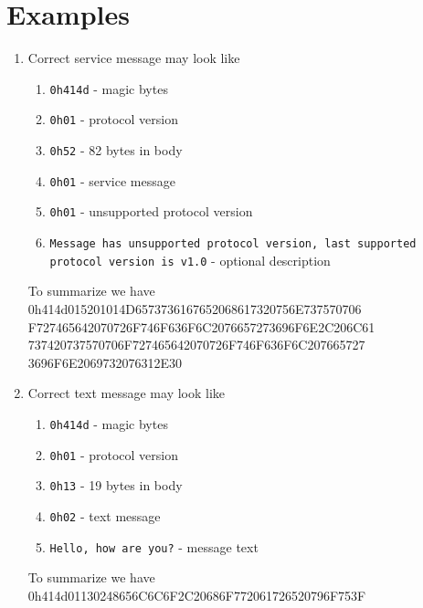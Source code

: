 \documentclass[12pt]{article}
\begin{document}
\section{Examples}
\begin{enumerate}
\item Correct service message may look like
\begin{enumerate}
\item \texttt{0h414d} - magic bytes
\item \texttt{0h01} - protocol version
\item \texttt{0h52} - 82 bytes in body
\item \texttt{0h01} - service message
\item \texttt{0h01} - unsupported protocol version
\item \texttt{Message has unsupported protocol version, last supported protocol version is v1.0} - optional description
\end{enumerate}
To summarize we have \\
0h414d015201014D6573736167652068617320756E737570706 \\
F727465642070726F746F636F6C2076657273696F6E2C206C61 \\
737420737570706F727465642070726F746F636F6C207665727 \\
3696F6E2069732076312E30
\item Correct text message may look like
\begin{enumerate}
\item \texttt{0h414d} - magic bytes
\item \texttt{0h01} - protocol version
\item \texttt{0h13} - 19 bytes in body
\item \texttt{0h02} - text message
\item \texttt{Hello, how are you?} - message text
\end{enumerate}
To summarize we have
0h414d01130248656C6C6F2C20686F772061726520796F753F
\end{enumerate}
\end{document}
